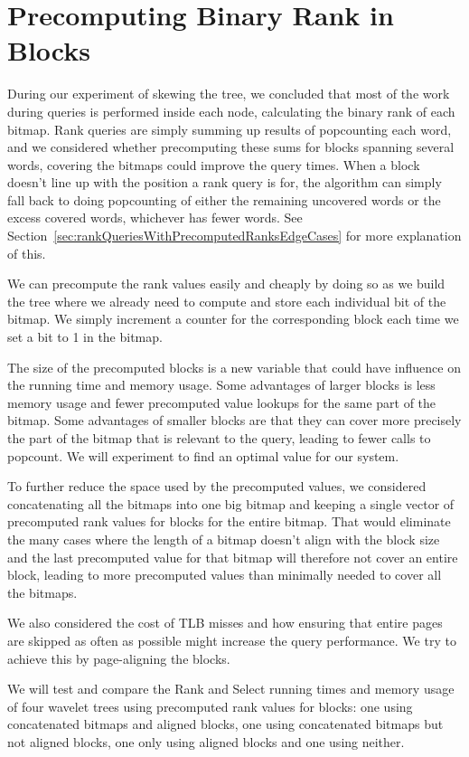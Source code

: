 \section{Precomputing Binary Rank in Blocks}
During our experiment of skewing the tree, we concluded that most of the work during queries is performed inside each node, calculating the binary rank of each bitmap.
Rank queries are simply summing up results of popcounting each word, and we considered whether precomputing these sums for blocks spanning several words, covering the bitmaps could improve the query times.
When a block doesn't line up with the position a rank query is for, the algorithm can simply fall back to doing popcounting of either the remaining uncovered words or the excess covered words, whichever has fewer words.
See Section~\ref{sec:rankQueriesWithPrecomputedRanksEdgeCases} for more explanation of this.

We can precompute the rank values easily and cheaply by doing so as we build the tree where we already need to compute and store each individual bit of the bitmap.
We simply increment a counter for the corresponding block each time we set a bit to 1 in the bitmap.

The size of the precomputed blocks is a new variable that could have influence on the running time and memory usage.
Some advantages of larger blocks is less memory usage and fewer precomputed value lookups for the same part of the bitmap.
Some advantages of smaller blocks are that they can cover more precisely the part of the bitmap that is relevant to the query, leading to fewer calls to popcount.
We will experiment to find an optimal value for our system.

To further reduce the space used by the precomputed values, we considered concatenating all the bitmaps into one big bitmap and keeping a single vector of precomputed rank values for blocks for the entire bitmap. 
That would eliminate the many cases where the length of a bitmap doesn't align with the block size and the last precomputed value for that bitmap will therefore not cover an entire block, leading to more precomputed values than minimally needed to cover all the bitmaps.

We also considered the cost of TLB misses and how ensuring that entire pages are skipped as often as possible might increase the query performance. We try to achieve this by page-aligning the blocks.

We will test and compare the Rank and Select running times and memory usage of four wavelet trees using precomputed rank values for blocks: one using concatenated bitmaps and aligned blocks, one using concatenated bitmaps but not aligned blocks, one only using aligned blocks and one using neither.





